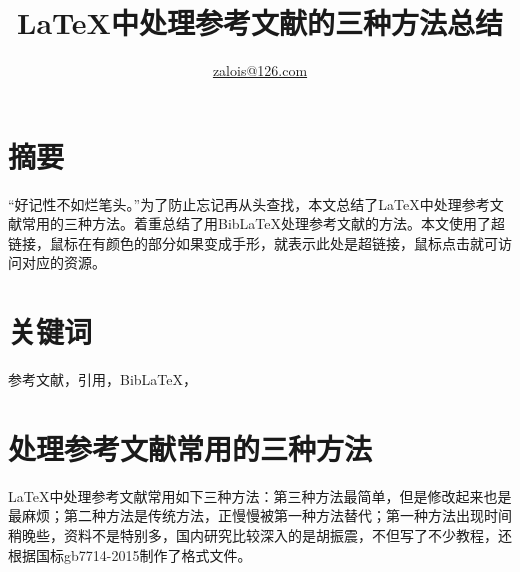 \documentclass[cn,hazy,blue,14pt,geye,normal,]{elegantnote}
\title{\LaTeX{}中处理参考文献的三种方法总结}
\author{\href{mailto:zalois@126.com}{zalois@126.com}}
\date{\zhtoday}
\begin{document}
%
\maketitle
\section{摘要}
	``好记性不如烂笔头。''为了防止忘记再从头查找，本文总结了\LaTeX{}中处理参考文献常用的三种方法。着重总结了用Bib\LaTeX{}处理参考文献的方法。本文使用了超链接，鼠标在有颜色的部分如果变成手形，就表示此处是超链接，鼠标点击就可访问对应的资源。
\section{关键词}
	参考文献，引用，Bib\LaTeX{}，\BibTeX{}
\section{处理参考文献常用的三种方法}
\LaTeX{}中处理参考文献常用如下三种方法：第三种方法最简单，但是修改起来也是最麻烦；第二种方法是传统方法，正慢慢被第一种方法替代；第一种方法出现时间稍晚些，资料不是特别多，国内研究比较深入的是胡振震，不但写了不少教程\cite{HuShidong20200726,huzhengzheng20200602}，还根据国标gb7714-2015制作了格式文件\cite{HuShidong20200726}。
\end{document}
